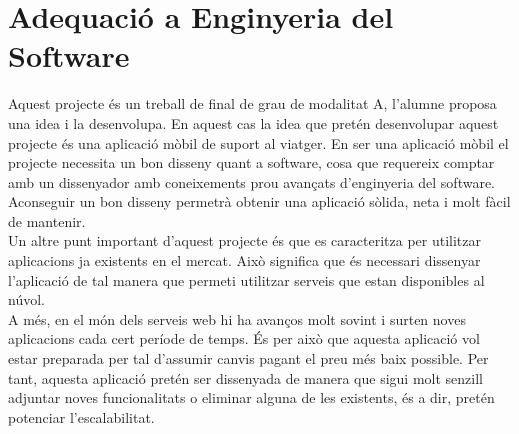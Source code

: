 \section{Adequació a Enginyeria del Software}

Aquest projecte és un treball de final de grau de modalitat A, l'alumne proposa una idea i la desenvolupa. En aquest cas la idea que pretén desenvolupar aquest projecte és una aplicació mòbil de suport al viatger. En ser una aplicació mòbil el projecte necessita un bon disseny quant a software, cosa que requereix comptar amb un dissenyador amb coneixements prou avançats d'enginyeria del software. Aconseguir un bon disseny permetrà obtenir una aplicació sòlida, neta i molt fàcil de
mantenir.\\

Un altre punt important d'aquest projecte és que es caracteritza per utilitzar aplicacions ja existents en el mercat. Això significa que és necessari dissenyar l'aplicació de tal manera que permeti utilitzar serveis que estan disponibles al núvol.\\

A més, en el món dels serveis web hi ha avanços molt sovint i surten noves
aplicacions cada cert període de temps. És per això que aquesta aplicació vol estar preparada per tal d'assumir canvis pagant el preu més baix possible. Per tant, aquesta aplicació pretén ser dissenyada de manera que sigui molt senzill adjuntar noves funcionalitats o eliminar alguna de les existents, és a dir, pretén potenciar l'escalabilitat.

